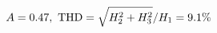 \documentclass[preview]{standalone}
\begin{document}
\begin{align*}
\special{dvisvgm:raw <g id='unique000'>}A=0.47,\ \text{THD}=\sqrt{H_2^2+H_3^2}/H_1=9.1\%\special{dvisvgm:raw </g>}
\end{align*}
\end{document}

